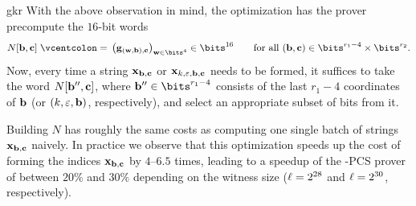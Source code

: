\begin{lncsappendix}{gkr}
With the above observation in mind, the optimization has  the prover  precompute  the $16$-bit words  
$$N[\bb,\cc]\defeq \left(\bfg_{(\ww,\bb),\cc}\right)_{\ww\in \bits^4}\in \bits^{16} \qquad \text{for all } (\bb,\cc)\in \bits^{r_1-4}\times \bits^{r_2}.$$
Now, every time a string $\mathbf{x}_{\mathbf{b},\mathbf{c}}$ or $\mathbf{x}_{k,\varepsilon,\mathbf{b},\mathbf{c}}$ needs to be formed, it suffices to take the word $N[\mathbf{b}'',\mathbf{c}]$, where $\bb''\in\bits^{r_1-4}$ consists of the last $r_1-4$ coordinates of $\mathbf{b}$ (or $(k,\varepsilon,\mathbf{b})$, respectively), and select an appropriate subset of bits from it.  




 Building $N$ has roughly the same costs as computing one single batch of strings $\mathbf{x}_{\mathbf{b},\mathbf{c}}$ naively. In practice we observe that this optimization speeds up the cost of forming the indices $\mathbf{x}_{\mathbf{b},\mathbf{c}}$ by $4$--$6.5$ times, leading to a speedup of the \ftwoz-PCS prover of between $20\%$ and $30\%$ depending on the witness size ($\ell=2^{28}$ and $\ell=2^{30}$, respectively).

\renewcommand{\comfield}{\FF_{2^{\comfieldexp}}}





\end{lncsappendix}
